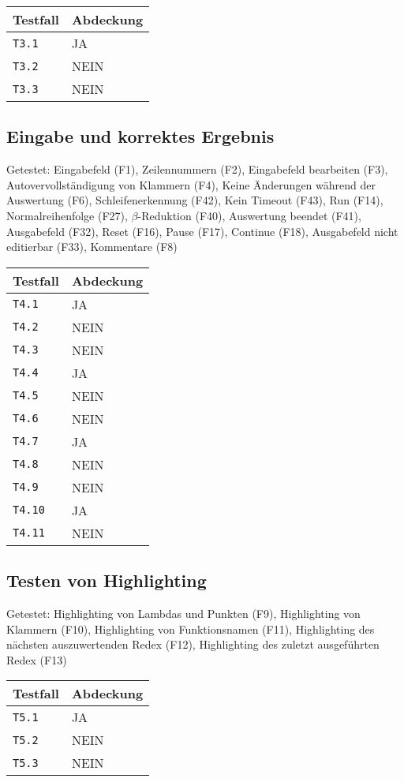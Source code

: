 \documentclass[parskip=full,11pt,twoside]{scrartcl}
\newcommand{\testline}[2]{
    \texttt{#1} & \ifthenelse{\equal{#2}{JA}}{\cellcolor{green!20}}{\cellcolor{red!20}}#2 \\ \hline
}
\begin{document}
    \label{shortcuts}
    \begin{center}
        \begin{tabular}{ p{9cm} p{4cm}}
            Testfall & Abdeckung \\ \hline
            \testline{T3.1}{JA}
            \testline{T3.2}{NEIN}
            \testline{T3.3}{NEIN}
        \end{tabular}
    \end{center}

\subsection{Eingabe und korrektes Ergebnis}
    Getestet:
    Eingabefeld (F1),
    Zeilennummern (F2),
    Eingabefeld bearbeiten (F3),
    Autovervollständigung von Klammern (F4),
    Keine Änderungen während der Auswertung (F6),
    Schleifenerkennung (F42),
    Kein Timeout (F43),
    Run (F14),
    Normalreihenfolge (F27),
    $\beta$-Reduktion (F40),
    Auswertung beendet (F41),
    Ausgabefeld (F32),
    Reset (F16),
    Pause (F17),
    Continue (F18),
    Ausgabefeld nicht editierbar (F33),
    Kommentare (F8)

    \label{shortcuts}
    \begin{center}
        \begin{tabular}{ p{9cm} p{4cm}}
            Testfall & Abdeckung \\ \hline
            \testline{T4.1}{JA}
            \testline{T4.2}{NEIN}
            \testline{T4.3}{NEIN}
            \testline{T4.4}{JA}
            \testline{T4.5}{NEIN}
            \testline{T4.6}{NEIN}
            \testline{T4.7}{JA}
            \testline{T4.8}{NEIN}
            \testline{T4.9}{NEIN}
            \testline{T4.10}{JA}
            \testline{T4.11}{NEIN}
        \end{tabular}
    \end{center}

\subsection{Testen von Highlighting}
    Getestet:
    Highlighting von Lambdas und Punkten (F9),
    Highlighting von Klammern (F10),
    Highlighting von Funktionsnamen (F11),
    Highlighting des nächsten auszuwertenden Redex (F12),
    Highlighting des zuletzt ausgeführten Redex (F13)

    \label{shortcuts}
    \begin{center}
        \begin{tabular}{ p{9cm} p{4cm}}
            Testfall & Abdeckung \\ \hline
            \testline{T5.1}{JA}
            \testline{T5.2}{NEIN}
            \testline{T5.3}{NEIN}
        \end{tabular}
    \end{center}
\end{document}
